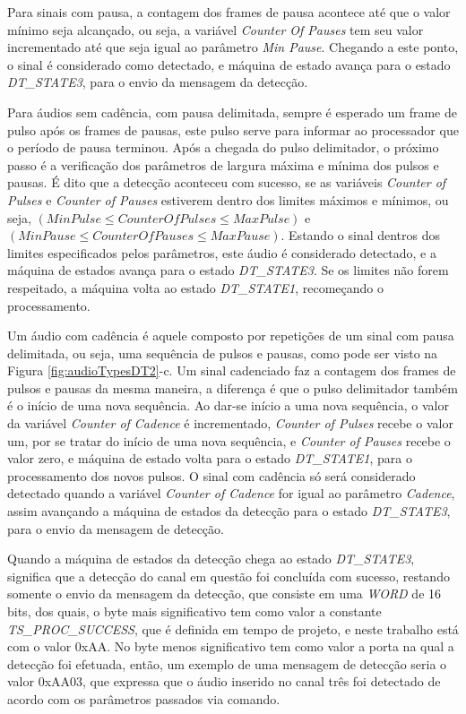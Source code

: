 \documentclass[monografia]{subfiles}
\begin{document}
				Para sinais com pausa, a contagem dos frames de pausa acontece até que o valor mínimo seja alcançado, ou seja, a variável \textit{Counter Of Pauses}
				tem seu valor incrementado até que seja igual ao parâmetro \textit{Min Pause}. Chegando a este ponto, o sinal é considerado como detectado, e máquina
				de estado avança para o estado \textit{DT\_STATE3}, para o envio da mensagem da detecção.
				
				Para áudios sem cadência, com pausa delimitada, sempre é esperado um frame de pulso após os frames de pausas, este pulso serve para informar ao
				processador que o período de pausa terminou. Após a chegada do pulso delimitador, o próximo passo é a verificação dos parâmetros de largura máxima
				e mínima dos pulsos e pausas. É dito que a detecção aconteceu com sucesso, se as variáveis \textit{Counter of Pulses} e \textit{Counter of Pauses}
				estiverem dentro dos limites máximos e mínimos, ou seja, $(Min Pulse \le CounterOfPulses \le Max Pulse)$ e 
				$(Min Pause \le CounterOfPauses \le Max Pause)$. Estando o sinal dentros dos limites especificados pelos parâmetros, este áudio é considerado
				detectado, e a máquina de estados avança para o estado \textit{DT\_STATE3}. Se os limites não forem respeitado, a máquina volta ao estado
				\textit{DT\_STATE1}, recomeçando o processamento.

				Um áudio com cadência é aquele composto por repetições de um sinal com pausa delimitada, ou seja, uma sequência de pulsos e pausas, como pode ser
				visto na Figura \ref{fig:audioTypesDT2}-c. Um sinal cadenciado faz a contagem dos frames de pulsos e pausas da mesma maneira, a diferença é que
				o pulso delimitador também é o início de uma nova sequência. Ao dar-se início a uma nova sequência, o valor da variável \textit{Counter of Cadence}
				é incrementado, \textit{Counter of Pulses} recebe o valor um, por se tratar do início de uma nova sequência,
				e \textit{Counter of Pauses} recebe o valor zero, e máquina de estado volta para o estado \textit{DT\_STATE1}, para o processamento dos novos pulsos.
				O sinal com cadência só será considerado detectado quando a variável \textit{Counter of Cadence} for igual ao parâmetro \textit{Cadence}, assim
				avançando a máquina de estados da detecção para o estado \textit{DT\_STATE3}, para o envio da mensagem de detecção.				


				\label{sec:dtState3Section}
				Quando a máquina de estados da detecção chega ao estado \textit{DT\_STATE3}, significa que a detecção do canal em questão foi concluída com sucesso,
				restando somente o envio da mensagem da detecção, que consiste em uma \textit{WORD} de 16 bits, dos quais, o byte mais significativo tem como valor a
				constante \textit{TS\_PROC\_SUCCESS}, que é definida em tempo de projeto, e neste trabalho está com o valor 0xAA. No byte menos significativo
				tem como valor a porta na qual a detecção foi efetuada, então, um exemplo de uma mensagem de detecção seria o valor 0xAA03, que expressa que o 
				áudio inserido no canal três foi detectado de acordo com os parâmetros passados via comando.			
\end{document}
